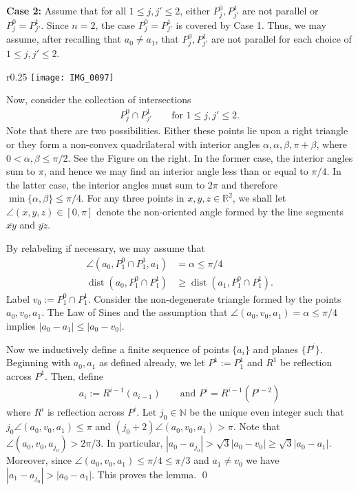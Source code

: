 \documentclass[12pt]{amsart}
\numberwithin{equation}{section}
\theoremstyle{plain}
\theoremstyle{definition}
\newcommand{\dist}{\mathop\mathrm{dist}\nolimits}
\begin{document}
\textbf{Case 2:} Assume that for all $1\le j, j'\le 2$, either $P_j^0, P_{j'}^1$ are not parallel or $P_j^0 = P_{j'}^1$.  Since $n=2$, the case $P_j^0 = P_{j'}^1$ is covered by Case 1. Thus, we may assume, after recalling that $a_0 \not = a_1$, that $P_j^0, P_{j'}^1$ are not parallel for each choice of $1\le j, j'\le 2$.  

\begin{wrapfigure}{r}{0.25\textwidth}   \label{f:1}\texttt{[image: IMG\_0097]}
\end{wrapfigure}

Now, consider the collection of intersections 
\begin{align*}
    P^0_j \cap P_{j'}^1 \qquad \text{for }1 \le j, j' \le 2. 
\end{align*}
Note that there are two possibilities.  Either these points lie upon a right triangle or they form a non-convex quadrilateral with interior angles $\alpha, \alpha, \beta, \pi + \beta$, where $0<\alpha,\beta \le \pi/2$.  See the Figure on the right.  In the former case, the interior angles sum to $\pi$, and hence we may find an interior angle less than or equal to $\pi/4$.  In the latter case, the interior angles must sum to $2\pi$ and therefore $\min\{\alpha, \beta\} \le \pi/4$.   For any three points in $x, y, z \in \mathbb{R}^2$, we shall let $\angle(x, y, z) \in [0, \pi]$ denote the non-oriented angle formed by the line segments $\overline{xy}$ and $\overline{yz}$. 

By relabeling if necessary, we may assume that 
\begin{align*}
    \angle(a_0, P^0_1 \cap P_{1}^1, a_1) & = \alpha \le \pi/4\\
\dist(a_0, P^0_1 \cap P_{1}^1) & \ge \dist(a_1, P^0_1 \cap P_{1}^1).    
\end{align*}
Label $v_0 := P^0_1 \cap P_{1}^1$. Consider the non-degenerate triangle formed by the points $a_0, v_0, a_1$. The Law of Sines and the assumption that $\angle(a_0, v_0, a_1)= \alpha \le \pi/4$ implies $|a_0-a_1| \le |a_0- v_0|$.

Now we inductively define a finite sequence of points $\{a_i\}$ and planes $\{P^i\}$.  Beginning with $a_0, a_1$ as defined already, we let $P^1 := P_1^1$ and $R^1$ be reflection across $P^1$.  Then, define
\begin{align*}
    a_{i} := R^{i-1}(a_{i-1}) \qquad \text{and } P^{i} = R^{i-1}(P^{i-2})
\end{align*}
where $R^i$ is reflection across $P^i$.  Let $j_0 \in \mathbb{N}$ be the unique even integer such that $j_0\angle(a_0,v_0,a_{1}) \le \pi$ and $(j_0 + 2)\angle(a_{0},v_0,a_{1}) > \pi$.  Note that $\angle(a_0,v_0,a_{j_0}) > 2\pi/3$.  In particular, $|a_0- a_{j_0}| > \sqrt{3}|a_0- v_0| \ge \sqrt{3}|a_0-a_1|$. Moreover, since $\angle(a_0,v_0,a_{1}) \le \pi/4 \le \pi/3$ and $a_1 \not = v_0$ we have $|a_1 - a_{j_0}| > |a_0 - a_1|$. This proves the lemma. \qed
\end{document}

